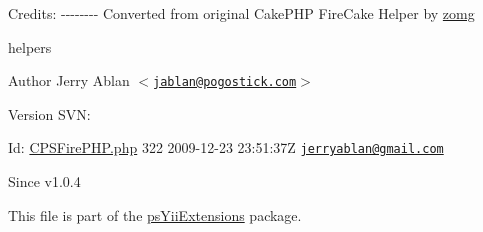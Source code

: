 Credits: -\/-\/-\/-\/-\/-\/-\/-\/ Converted from original CakePHP FireCake Helper by \hyperlink{}{zomg}

helpers

\begin{DoxyAuthor}{Author}
Jerry Ablan $<$\href{mailto:jablan@pogostick.com}{\tt jablan@pogostick.com}$>$ 
\end{DoxyAuthor}
\begin{DoxyVersion}{Version}
SVN: 
\end{DoxyVersion}
\begin{DoxyParagraph}{Id:}
\hyperlink{CPSFirePHP_8php}{CPSFirePHP.php} 322 2009-\/12-\/23 23:51:37Z \href{mailto:jerryablan@gmail.com}{\tt jerryablan@gmail.com} 
\end{DoxyParagraph}
\begin{DoxySince}{Since}
v1.0.4
\end{DoxySince}


This file is part of the \hyperlink{namespacepsYiiExtensions}{psYiiExtensions} package.

